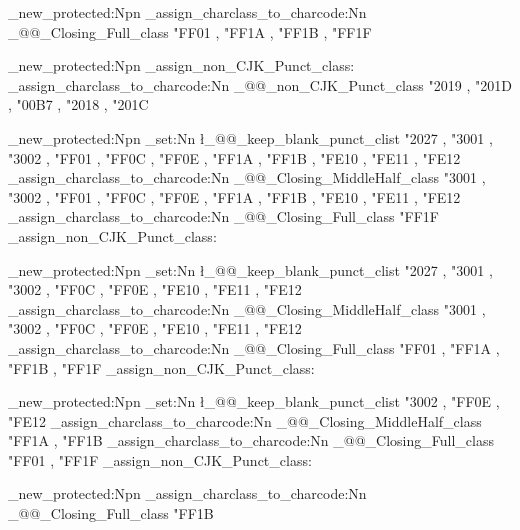 \cs_new_protected:Npn \ChineseSimplifiedV
  {
    \ChineseSimplifiedH
    \@@_assign_charclass_to_charcode:Nn \g_@@_Closing_Full_class
      {
        "FF01 , "FF1A , "FF1B , "FF1F
      }
  }

\cs_new_protected:Npn \@@_assign_non_CJK_Punct_class:
  {
    \@@_assign_charclass_to_charcode:Nn \g_@@_non_CJK_Punct_class
      {
        "2019 , "201D ,
        "00B7 ,
        "2018 , "201C
      }
  }

\cs_new_protected:Npn \ChineseTraditionalH
  {
    \ChineseSimplifiedH
    \clist_set:Nn \l_@@_keep_blank_punct_clist
      {
        "2027 ,
        "3001 , "3002 , "FF01 , "FF0C , "FF0E ,
        "FF1A , "FF1B ,
        "FE10 , "FE11 , "FE12
      }
    \@@_assign_charclass_to_charcode:Nn \g_@@_Closing_MiddleHalf_class
      {
        "3001 , "3002 , "FF01 , "FF0C , "FF0E ,
        "FF1A , "FF1B ,
        "FE10 , "FE11 , "FE12
      }
    \@@_assign_charclass_to_charcode:Nn \g_@@_Closing_Full_class
      {
        "FF1F
      }
    \@@_assign_non_CJK_Punct_class:
  }

\cs_new_protected:Npn \ChineseTraditionalV
  {
    \ChineseSimplifiedH
    \clist_set:Nn \l_@@_keep_blank_punct_clist
      {
        "2027 ,
        "3001 , "3002 , "FF0C , "FF0E ,
        "FE10 , "FE11 , "FE12
      }
    \@@_assign_charclass_to_charcode:Nn \g_@@_Closing_MiddleHalf_class
      {
        "3001 , "3002 , "FF0C , "FF0E ,
        "FE10 , "FE11 , "FE12
      }
    \@@_assign_charclass_to_charcode:Nn \g_@@_Closing_Full_class
      {
        "FF01 , "FF1A , "FF1B , "FF1F
      }
    \@@_assign_non_CJK_Punct_class:
  }

\cs_new_protected:Npn \JapaneseH
  {
    \ChineseSimplifiedH
    \clist_set:Nn \l_@@_keep_blank_punct_clist
      {
        "3002 , "FF0E , "FE12
      }
    \@@_assign_charclass_to_charcode:Nn \g_@@_Closing_MiddleHalf_class
      {
        "FF1A , "FF1B
      }
    \@@_assign_charclass_to_charcode:Nn \g_@@_Closing_Full_class
      {
        "FF01 , "FF1F
      }
    \@@_assign_non_CJK_Punct_class:
  }

\cs_new_protected:Npn \JapaneseV
  {
    \JapaneseH
    \@@_assign_charclass_to_charcode:Nn \g_@@_Closing_Full_class
      {
        "FF1B
      }
  }

\ExplSyntaxOff
\makeatother